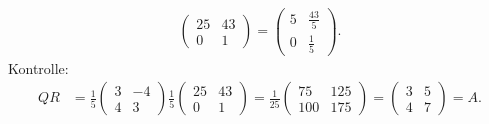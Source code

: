 \begin{loesung}
\begin{align*}
\begin{pmatrix}
25&43\\
 0&1
\end{pmatrix}
=\begin{pmatrix}
5&\frac{43}{5}\\
0&\frac{1}{5}
\end{pmatrix}.
\end{align*}
Kontrolle:
\begin{align*}
QR&=\frac15\begin{pmatrix}3&-4\\4&3\end{pmatrix}\frac15\begin{pmatrix}25&43\\0&1\end{pmatrix}
=\frac1{25}\begin{pmatrix}75&125\\100&175\end{pmatrix}
=\begin{pmatrix}3&5\\4&7\end{pmatrix}=A.
\end{align*}
\end{loesung}
